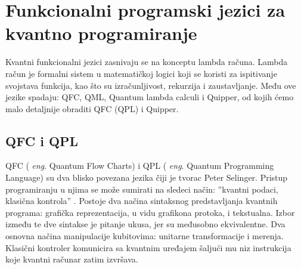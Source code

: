 \documentclass[a4paper]{article}
\begin{document}
{\section{Funkcionalni programski jezici za kvantno programiranje}
\label{sec:funcprl_qp}
Kvantni funkcionalni jezici zasnivaju se na konceptu lambda računa. Lambda račun je formalni sistem u matematičkoj logici koji se koristi za ispitivanje svojstava funkcija, kao što su izračunljivost, rekurzija i zaustavljanje.\cite{survey} Među ove jezike spadaju: QFC, QML, Quantum lambda calculi i Quipper, od kojih ćemo malo detaljnije obraditi QFC (QPL) i Quipper.

\subsection{QFC i QPL}
\label{sec:qfc_qml}

QFC ( \emph{eng}. Quantum Flow Charts) i QPL ( \emph{eng}. Quantum Programming Language) su dva blisko povezana jezika čiji je tvorac Peter Selinger.  Pristup programiranju u njima se može sumirati na sledeci način: ''kvantni podaci, klasična kontrola'' \cite[p. 1]{qfc}. Postoje dva načina sintaksnog predstavljanja kvantnih programa: grafička reprezentacija, u vidu grafikona protoka, i tekstualna. Izbor između te dve sintakse je pitanje ukusa, jer su međusobno ekvivalentne. \cite[p. 2]{qfc} Dva osnovna načina manipulacije kubitovima: unitarne transformacije i merenja. Klasični kontroler komunicira sa kvantnim uređajem šaljući mu niz instrukcija koje kvantni računar zatim izvršava. 

}
\end{document}
